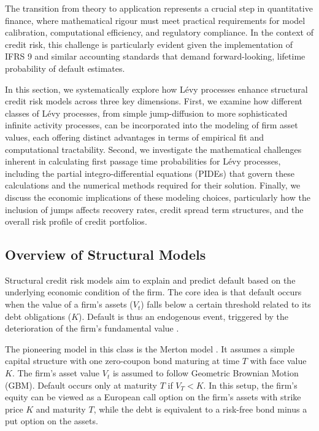 \documentclass[11pt,twoside,openright]{report}
\begin{document}
The transition from theory to application represents a crucial step in quantitative finance, where mathematical rigour must meet practical requirements for model calibration, computational efficiency, and regulatory compliance. In the context of credit risk, this challenge is particularly evident given the implementation of IFRS 9 and similar accounting standards that demand forward-looking, lifetime probability of default estimates.

In this section, we systematically explore how Lévy processes enhance structural credit risk models across three key dimensions. First, we examine how different classes of Lévy processes, from simple jump-diffusion to more sophisticated infinite activity processes, can be incorporated into the modeling of firm asset values, each offering distinct advantages in terms of empirical fit and computational tractability. Second, we investigate the mathematical challenges inherent in calculating first passage time probabilities for Lévy processes, including the partial integro-differential equations (PIDEs) that govern these calculations and the numerical methods required for their solution. Finally, we discuss the economic implications of these modeling choices, particularly how the inclusion of jumps affects recovery rates, credit spread term structures, and the overall risk profile of credit portfolios.

\subsection{Overview of Structural Models}
\label{subsec:overview_structural}

Structural credit risk models aim to explain and predict default based on the underlying economic condition of the firm. The core idea is that default occurs when the value of a firm's assets ($V_t$) falls below a certain threshold related to its debt obligations ($K$). Default is thus an endogenous event, triggered by the deterioration of the firm's fundamental value \cite{schoutens2010levy}.

The pioneering model in this class is the Merton model \cite{merton1974pricing}. It assumes a simple capital structure with one zero-coupon bond maturing at time $T$ with face value $K$. The firm's asset value $V_t$ is assumed to follow Geometric Brownian Motion (GBM). Default occurs only at maturity $T$ if $V_T < K$. In this setup, the firm's equity can be viewed as a European call option on the firm's assets with strike price $K$ and maturity $T$, while the debt is equivalent to a risk-free bond minus a put option on the assets.
\end{document}
